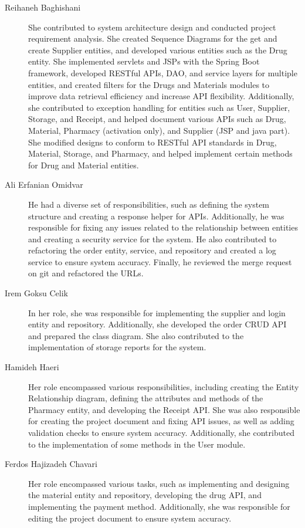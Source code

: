 \begin{description}
	\item[Reihaneh Baghishani] She contributed to system architecture design and conducted project requirement analysis. She created Sequence Diagrams for the get and create Supplier entities, and developed various entities such as the Drug entity. She implemented servlets and JSPs with the Spring Boot framework, developed RESTful APIs, DAO, and service layers for multiple entities, and created filters for the Drugs and Materials modules to improve data retrieval efficiency and increase API flexibility. Additionally, she contributed to exception handling for entities such as User, Supplier, Storage, and Receipt, and helped document various APIs such as Drug, Material, Pharmacy (activation only), and Supplier (JSP and java part). She modified designs to conform to RESTful API standards in Drug, Material, Storage, and Pharmacy, and helped implement certain methods for Drug and Material entities.

	\item[Ali Erfanian Omidvar] He had a diverse set of responsibilities, such as defining the system structure and creating a response helper for APIs. Additionally, he was responsible for fixing any issues related to the relationship between entities and creating a security service for the system. He also contributed to refactoring the order entity, service, and repository and created a log service to ensure system accuracy. Finally, he reviewed the merge request on git and refactored the URLs.
 
	\item[Irem Goksu Celik] In her role, she was responsible for implementing the supplier and login entity and repository. Additionally, she developed the order CRUD API and prepared the class diagram. She also contributed to the implementation of storage reports for the system.
 
	\item[Hamideh Haeri] Her role encompassed various responsibilities, including creating the Entity Relationship diagram, defining the attributes and methods of the Pharmacy entity, and developing the Receipt API. She was also responsible for creating the project document and fixing API issues, as well as adding validation checks to ensure system accuracy. Additionally, she contributed to the implementation of some methods in the User module.
 
	\item[Ferdos Hajizadeh Chavari] Her role encompassed various tasks, such as implementing and designing the material entity and repository, developing the drug API, and implementing the payment method. Additionally, she was responsible for editing the project document to ensure system accuracy.
 

\end{description}
